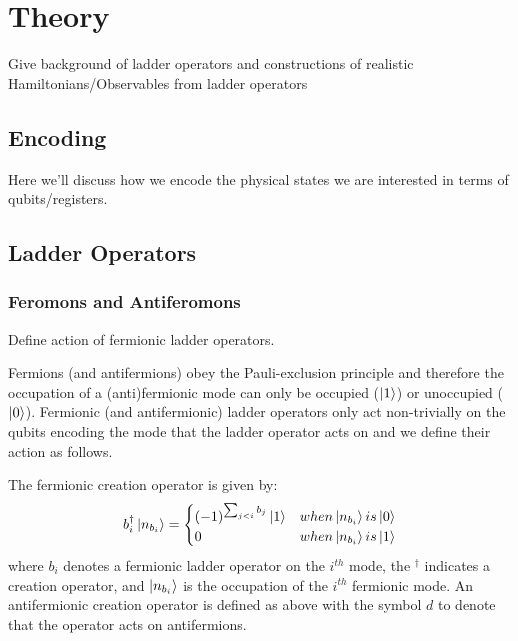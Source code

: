 \section{Theory}

Give background of ladder operators and constructions of realistic Hamiltonians/Observables from ladder operators

\subsection{Encoding}
\label{subsec:encoding}

Here we'll discuss how we encode the physical states we are interested in terms of qubits/registers.


\subsection{Ladder Operators}
\label{subsec:operators}



\subsubsection{Feromons and Antiferomons}

Define action of fermionic ladder operators.

Fermions (and antifermions) obey the Pauli-exclusion principle  and therefore the occupation of a (anti)fermionic mode can only be occupied ($\ket{1}$) or unoccupied ($\ket{0}$).
Fermionic (and antifermionic) ladder operators only act non-trivially on the qubits encoding the mode that the ladder operator acts on and we define their action as follows.

The fermionic creation operator is given by:
\begin{equation}
    b_i^\dagger \ket{n_{b_i}} = 
    \begin{cases} 
        (-1)^{\sum_{j < i} b_j} \ket{1}  & when \ket{n_{b_i}} is \ket{0} \\
        0 & when \ket{n_{b_i}} is \ket{1}
    \end{cases}
\end{equation}
where $b_i$ denotes a fermionic ladder operator on the $i^{th}$ mode, the $^\dagger$ indicates a creation operator, and $\ket{n_{b_i}}$ is the occupation of the $i^{th}$ fermionic mode.
An antifermionic creation operator is defined as above with the symbol $d$ to denote that the operator acts on antifermions.

